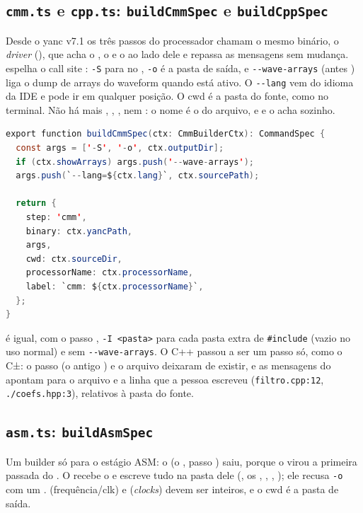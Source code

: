 \subsection{\texttt{cmm.ts} e \texttt{cpp.ts}: \texttt{buildCmmSpec} e \texttt{buildCppSpec}}

Desde o yanc v7.1 os três passos do processador chamam o mesmo binário, o
\emph{driver}  (), que acha o
, o  e o  ao lado dele e repassa as
mensagens sem mudança.  espelha o call site
: \lstinline|-S| para no , \lstinline|-o| é a
pasta de saída, e \lstinline|--wave-arrays| (antes ) liga o dump de
arrays do waveform quando  está ativo. O \lstinline|--lang| vem
do idioma da IDE e pode ir em qualquer posição. O cwd é a pasta do fonte, como no
terminal. Não há mais , , ,  nem :
o nome é o do arquivo, e  e  o  acha sozinho.

\begin{lstlisting}[language=Java]
export function buildCmmSpec(ctx: CmmBuilderCtx): CommandSpec {
  const args = ['-S', '-o', ctx.outputDir];
  if (ctx.showArrays) args.push('--wave-arrays');
  args.push(`--lang=${ctx.lang}`, ctx.sourcePath);

  return {
    step: 'cmm',
    binary: ctx.yancPath,
    args,
    cwd: ctx.sourceDir,
    processorName: ctx.processorName,
    label: `cmm: ${ctx.processorName}`,
  };
}
\end{lstlisting}

 é igual, com o passo , \lstinline|-I <pasta>| para
cada pasta extra de \lstinline|#include| (vazio no uso normal) e sem
\lstinline|--wave-arrays|. O C++ passou a ser um passo só, como o C±: o passo
 (o antigo ) e o arquivo  deixaram de
existir, e as mensagens do  apontam para o arquivo e a linha que a
pessoa escreveu (\lstinline|filtro.cpp:12|, \lstinline|./coefs.hpp:3|),
relativos à pasta do fonte.

\subsection{\texttt{asm.ts}: \texttt{buildAsmSpec}}

Um builder só para o estágio ASM: o  (o ,
passo ) saiu, porque o  virou a primeira passada do
. O  recebe o  e escreve tudo na pasta dele
(, os , , ,
); ele recusa \lstinline|-o| com um .
 (frequência/clk) e  (\emph{clocks}) devem ser inteiros, e o
cwd é a pasta de saída.


